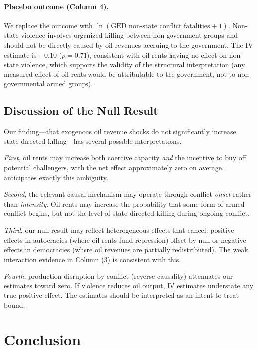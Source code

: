 \documentclass[12pt]{article}
\begin{document}
\paragraph{Placebo outcome (Column 4).}
We replace the outcome with $\ln(\text{GED non-state conflict fatalities}+1)$.
Non-state violence involves organized killing between non-government groups
and should not be directly caused by oil revenues accruing to the government.
The IV estimate is $-0.10$ ($p = 0.71$),
consistent with oil rents having no effect on non-state violence,
which supports the validity of the structural interpretation
(any measured effect of oil rents would be attributable to the government,
not to non-governmental armed groups).



\subsection{Discussion of the Null Result}

Our finding---that exogenous oil revenue shocks do not significantly increase
state-directed killing---has several possible interpretations.

\textit{First}, oil rents may increase both coercive capacity \emph{and}
the incentive to buy off potential challengers, with the net effect
approximately zero on average.
\citet{ross2001does} anticipates exactly this ambiguity.

\textit{Second}, the relevant causal mechanism may operate through
conflict \emph{onset} rather than \emph{intensity}.
Oil rents may increase the probability that some form of armed conflict begins,
but not the level of state-directed killing during ongoing conflict.

\textit{Third}, our null result may reflect heterogeneous effects that cancel:
positive effects in autocracies (where oil rents fund repression)
offset by null or negative effects in democracies (where oil revenues
are partially redistributed).
The weak interaction evidence in Column (3) is consistent with this.

\textit{Fourth}, production disruption by conflict (reverse causality)
attenuates our estimates toward zero.
If violence reduces oil output, IV estimates understate any true positive effect.
The estimates should be interpreted as an intent-to-treat bound.

\section{Conclusion}
\label{sec:discussion}
\end{document}
